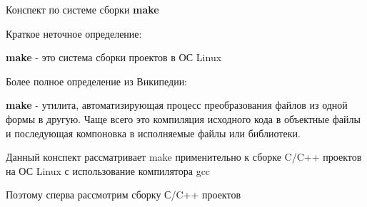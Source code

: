 


Конспект по системе сборки \textbf{make}

\vspace{0.2cm}

Краткое неточное определение:

\textbf{make} - это система сборки проектов в ОС Linux

Более полное определение из Википедии:

\textbf{make} - утилита, автоматизирующая процесс преобразования файлов из одной формы в другую. Чаще всего это компиляция исходного кода в объектные файлы и последующая компоновка в исполняемые файлы или библиотеки.

\vspace{0.2cm}

Данный конспект рассматривает make применительно к сборке C/C++ проектов на ОС Linux с использование компилятора gcc

Поэтому сперва рассмотрим сборку С/C++ проектов

\vspace{0.2cm}

